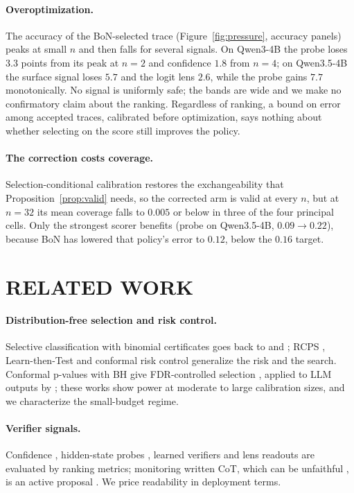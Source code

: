 \documentclass[twoside]{article}
\theoremstyle{remark}
\begin{document}
\paragraph{Overoptimization.} The accuracy of the BoN-selected trace (Figure~\ref{fig:pressure}, accuracy panels) peaks at small $n$ and then falls for several signals. On Qwen3-4B the probe loses $3.3$ points from its peak at $n=2$ and confidence $1.8$ from $n=4$; on Qwen3.5-4B the surface signal loses $5.7$ and the logit lens $2.6$, while the probe gains $7.7$ monotonically. No signal is uniformly safe; the bands are wide and we make no confirmatory claim about the ranking. Regardless of ranking, a bound on error among accepted traces, calibrated before optimization, says nothing about whether selecting on the score still improves the policy.

\paragraph{The correction costs coverage.} Selection-conditional calibration restores the exchangeability that Proposition~\ref{prop:valid} needs, so the corrected arm is valid at every $n$, but at $n=32$ its mean coverage falls to $0.005$ or below in three of the four principal cells. Only the strongest scorer benefits (probe on Qwen3.5-4B, $0.09\to0.22$), because BoN has lowered that policy's error to $0.12$, below the $0.16$ target.

\section{RELATED WORK}

\paragraph{Distribution-free selection and risk control.} Selective classification with binomial certificates goes back to \citet{elyaniv2010foundations} and \citet{geifman2017selective}; RCPS \citep{bates2021rcps}, Learn-then-Test \citep{angelopoulos2021ltt} and conformal risk control \citep{angelopoulos2024crc} generalize the risk and the search. Conformal p-values with BH give FDR-controlled selection \citep{bates2023outliers,jin2023selection}, applied to LLM outputs by \citet{gui2024conformal,mohri2024factuality,quach2024conformal}; these works show power at moderate to large calibration sizes, and we characterize the small-budget regime.

\paragraph{Verifier signals.} Confidence \citep{kadavath2022know}, hidden-state probes \citep{azaria2023internal,burns2023discovering,zhang2025reasoning}, learned verifiers \citep{cobbe2021gsm8k,lightman2024verify} and lens readouts \citep{nostalgebraist2020logit,belrose2023tuned,gurnee2026workspace} are evaluated by ranking metrics; monitoring written CoT, which can be unfaithful \citep{turpin2023unfaithful}, is an active proposal \citep{korbak2025monitorability,baker2025monitoring}. We price readability in deployment terms.
\end{document}

